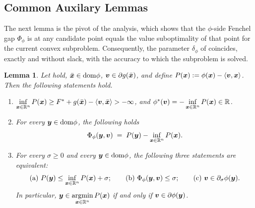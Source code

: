 \documentclass[english]{article}
\newtheorem{lemma}{Lemma}[section]
\begin{document}
\subsection{Common Auxilary Lemmas}

The next lemma is the pivot of the analysis, which shows that the $\phi$-side Fenchel gap $\Phi_\phi$ is at any candidate point equals the value suboptimality of that
point for the current convex subproblem. Consequently, the parameter
$\delta_\phi$ of  coincides, exactly and
without slack, with the accuracy to which the subproblem is solved.

\begin{lemma}
\label{lem:dca-subproblem-value}
Let  hold, $\bar{\bm{x}}\in\mathrm{dom}\phi$,
$\bm{v}\in\partial g(\bar{\bm{x}})$, and define
$P(\bm{x}):=\phi(\bm{x})-\langle\bm{v},\bm{x}\rangle$. Then the following statements
hold.
\begin{enumerate}
    \item[(i)] $\inf\limits_{\bm{x}\in\mathbb{R}^n}P(\bm{x})\ge
    F^\ast+g(\bar{\bm{x}})-\langle\bm{v},\bar{\bm{x}}\rangle>-\infty$, and
    $\phi^*(\bm{v})=-\inf\limits_{\bm{x}\in\mathbb{R}^n}P(\bm{x})\in\mathbb{R}$.
    \item[(ii)] For every $\bm{y}\in\mathrm{dom}\phi$, the following holds
    \[
        \Phi_\phi(\bm{y},\bm{v})
        \;=\;
        P(\bm{y})-\inf\limits_{\bm{x}\in\mathbb{R}^n}P(\bm{x}).
    \]
    \item[(iii)] For every $\sigma\ge0$ and every $\bm{y}\in\mathrm{dom}\phi$, the
    following three statements are equivalent:
    \[
        \text{(a) }P(\bm{y})\le\inf\limits_{\bm{x}\in\mathbb{R}^n}P(\bm{x})+\sigma;
        \qquad
        \text{(b) }\Phi_\phi(\bm{y},\bm{v})\le\sigma;
        \qquad
        \text{(c) }\bm{v}\in\partial_\sigma\phi(\bm{y}).
    \]
    In particular, $\bm{y}\in\operatorname*{\mathrm{argmin}}\limits_{\bm{x}\in\mathbb{R}^n}P(\bm{x})$ if and only if
    $\bm{v}\in\partial\phi(\bm{y})$.
\end{enumerate}
\end{lemma}
\end{document}
